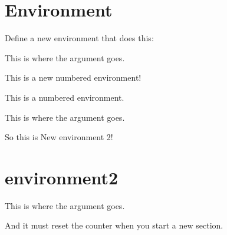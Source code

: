 \documentclass{article}
\newenvironment{new environment}[1]
{\begin{center}
		#1\vspace{0.1in}\\
		\begin{tabular}{|p{0.9\textwidth}|}
			\hline\\
		}
		{ 
			\\\\\hline
		\end{tabular} 
	\end{center}
}
\newenvironment{counter environment}[1]
{
	{\refstepcounter{ex}}
	\begin{center}
		#1\vspace{0.1in}\\
		\begin{tabular}{|p{0.9\textwidth}|}
			\hline\\
		}
		{ 
			\\\\\hline
		\end{tabular} 
	\end{center}
}
\newenvironment{last environment}[1]
{
	{\refstepcounter{ex}}
	\begin{center}
		\textbf{New envirionment \theex.}
		#1\vspace{0.1in}\\
		\begin{tabular}{|p{0.9\textwidth}|}
			\hline\\
		}
		{ 
			\\\\\hline
		\end{tabular} 
	\end{center}
}
\begin{document}
	\section{Environment}	
	Define a new environment that does this:
		\begin{last environment}{This is where the argument goes.}
			\begin{center}
				This is a new numbered environment!
			\end{center}
		\end{last environment}

	\noindent This is a numbered environment.
		\begin{last environment}{This is where the argument goes.}
			\begin{center}
				So this is New environment 2!
			\end{center}
		\end{last environment}

\newpage	
	
	\section{environment2}
		\begin{last environment}{This is where the argument goes.}
			\begin{center}
				And it must reset the counter when you start a new section.
			\end{center}
		\end{last environment}
\end{document}
